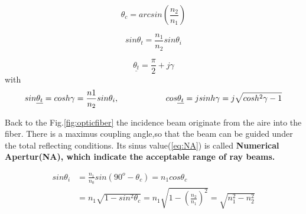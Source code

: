 \begin{equation}
\theta_{c}=arcsin(\frac{n_{2}}{n_{1}})
\label{eq:critical_angle}
\end{equation}

\begin{equation}
sin\theta_{t}=\frac{n_{1}}{n_{2}}sin\theta_{i}
\label{eq:sin_transmission_angle}
\end{equation}

\begin{equation}
\underline{\theta_{t}}=\frac{\pi}{2}+j\gamma
\label{eq:complex_transmission_angle}
\end{equation}
with
\begin{equation}
sin\underline{\theta_{t}}=cosh\gamma=\frac{n{1}}{n_{2}}sin\theta_{i},\hspace{2cm}\hfill cos\underline{\theta_{t}}=jsinh\gamma=j\sqrt{cosh^2\gamma-1}
\label{eq:trangle_transmission_angle}
\end{equation}


Back to the Fig.\ref{fig:opticfiber} the incidence beam originate from the aire into the fiber. There is a maximus coupling angle,so that the beam can be guided under the total reflecting conditions. Its sinus value(\ref{eq:NA}) is called \bf{Numerical Apertur(NA)}, which indicate the acceptable range of ray beams.

\begin{align}
sin\theta_{i}&=\frac{n_{1}}{n_{0}}sin(90^{o}-\theta_{c})=n_{1}cos\theta_{c} \nonumber\\
&=n_{1}\sqrt{1-sin^{2}\theta_{c}}=n_{1}\sqrt{1-\left(\frac{n_{2}}{n_{1}}\right)^2}=\sqrt{n^2_{1}-n^2_{2}}
\label{eq:NA}
\end{align}
